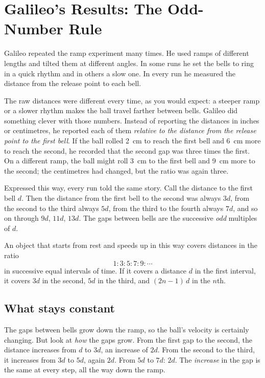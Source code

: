 \documentclass[11pt,twoside,openany]{book}
\begin{document}
\section{Galileo's Results: The Odd-Number Rule}
\label{sec:oddrule}

Galileo repeated the ramp experiment many times. He used ramps of different lengths and tilted them at different angles. In some runs he set the bells to ring in a quick rhythm and in others a slow one. In every run he measured the distance from the release point to each bell.

The raw distances were different every time, as you would expect: a steeper ramp or a slower rhythm makes the ball travel farther between bells. Galileo did something clever with those numbers. Instead of reporting the distances in inches or centimetres, he reported each of them \emph{relative to the distance from the release point to the first bell}. If the ball rolled \SI{2}{\centi\metre} to reach the first bell and \SI{6}{\centi\metre} more to reach the second, he recorded that the second gap was three times the first. On a different ramp, the ball might roll \SI{3}{\centi\metre} to the first bell and \SI{9}{\centi\metre} more to the second; the centimetres had changed, but the ratio was again three.

Expressed this way, every run told the same story. Call the distance to the first bell $d$. Then the distance from the first bell to the second was always $3d$, from the second to the third always $5d$, from the third to the fourth always $7d$, and so on through $9d$, $11d$, $13d$. The gaps between bells are the successive \emph{odd} multiples of $d$.

\begin{keyidea}
An object that starts from rest and speeds up in this way covers distances in the ratio
\[
1 : 3 : 5 : 7 : 9 : \cdots
\]
in successive equal intervals of time. If it covers a distance $d$ in the first interval, it covers $3d$ in the second, $5d$ in the third, and $(2n-1)\,d$ in the $n$th.
\end{keyidea}

\subsection{What stays constant}

The gaps between bells grow down the ramp, so the ball's velocity is certainly changing. But look at \emph{how} the gaps grow. From the first gap to the second, the distance increases from $d$ to $3d$, an increase of $2d$. From the second to the third, it increases from $3d$ to $5d$, again $2d$. From $5d$ to $7d$: $2d$. The \emph{increase} in the gap is the same at every step, all the way down the ramp.
\end{document}
